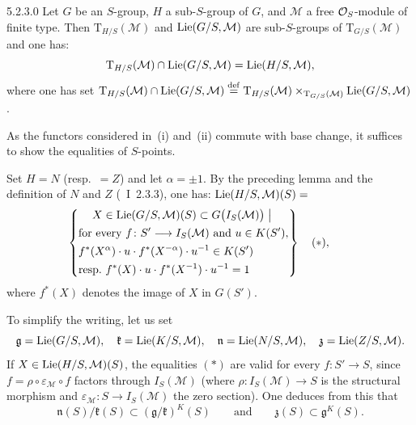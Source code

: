 \begin{lemma}{5.2.3.0}
\label{II.5.2.3.0}
Let \(G\) be an \(S\)-group, \(H\) a sub-\(S\)-group of \(G\), and
\(\mathcal{M}\) a free \(\mathcal{O}_S\)-module of finite type. Then
\(\mathrm{T}_{H/S}(\mathcal{M})\) and \(\operatorname{Lie}(G/S,\mathcal{M})\) are
sub-\(S\)-groups of \(\mathrm{T}_{G/S}(\mathcal{M})\) and one has:
\[
\mathrm{T}_{H/S}(\mathcal{M})\cap\operatorname{Lie}(G/S,\mathcal{M})
=\operatorname{Lie}(H/S,\mathcal{M}),
\]
where one has set
\(\mathrm{T}_{H/S}(\mathcal{M})\cap\operatorname{Lie}(G/S,\mathcal{M})
\overset{\mathrm{def}}{=}
\mathrm{T}_{H/S}(\mathcal{M})
\times_{\mathrm{T}_{G/S}(\mathcal{M})}
\operatorname{Lie}(G/S,\mathcal{M})\).
\end{lemma}

As the functors considered in~(i) and~(ii) commute with base change, it
suffices to show the equalities of \(S\)-points.

Set \(H=N\) (resp.\ \(=Z\)) and let \(\alpha=\pm 1\). By the preceding lemma
and the definition of \(N\) and \(Z\) (\cf~I~2.3.3), one has:
\(\operatorname{Lie}(H/S,\mathcal{M})(S)=\)
\[
\left\{
\begin{gathered}
X\in\operatorname{Lie}(G/S,\mathcal{M})(S)\subset G\bigl(I_S(\mathcal{M})\bigr)
\;\big|\;\\
\begin{aligned}
&\text{for every }f\colon S'\longrightarrow I_S(\mathcal{M})\text{ and }u\in K(S'),\\
&f^*(X^{\alpha})\cdot u\cdot f^*(X^{-\alpha})\cdot u^{-1}\in K(S')\\
&\text{resp.\ }f^*(X)\cdot u\cdot f^*(X^{-1})\cdot u^{-1}=1
\end{aligned}
\end{gathered}
\right\}
\quad(*),\qquad
\]
where \(f^*(X)\) denotes the image of \(X\) in \(G(S')\).

To simplify the writing, let us set
\[
\mathfrak{g}=\operatorname{Lie}(G/S,\mathcal{M}),\quad
\mathfrak{k}=\operatorname{Lie}(K/S,\mathcal{M}),\quad
\mathfrak{n}=\operatorname{Lie}(N/S,\mathcal{M}),\quad
\mathfrak{z}=\operatorname{Lie}(Z/S,\mathcal{M}).
\]
If \(X\in\operatorname{Lie}(H/S,\mathcal{M})(S)\), the equalities \((*)\) are valid for
every \(f\colon S'\to S\), since \(f=\rho\circ\varepsilon_{\mathcal{M}}\circ f\)
factors through \(I_S(\mathcal{M})\) (where
\(\rho\colon I_S(\mathcal{M})\to S\) is the structural morphism and
\(\varepsilon_{\mathcal{M}}\colon S\to I_S(\mathcal{M})\) the zero section).
One deduces from this that
\[
\mathfrak{n}(S)/\mathfrak{k}(S)
\subset(\mathfrak{g}/\mathfrak{k})^{K}(S)
\qquad\text{and}\qquad
\mathfrak{z}(S)\subset\mathfrak{g}^{K}(S).
\]
